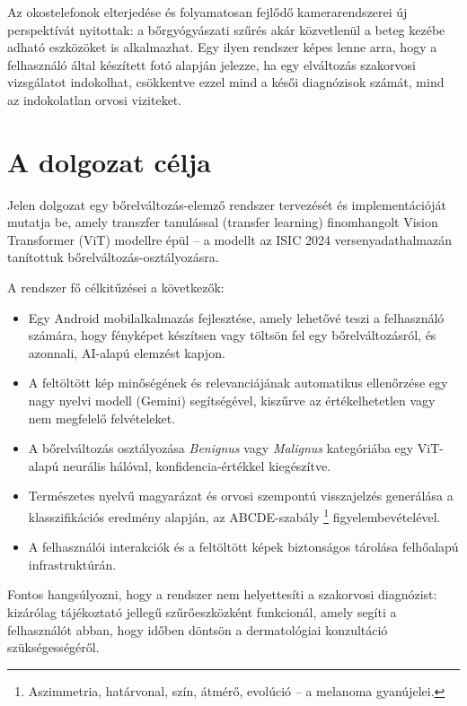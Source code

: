 Az okostelefonok elterjedése és folyamatosan fejlődő kamerarendszerei új
perspektívát nyitottak: a bőrgyógyászati szűrés akár közvetlenül a beteg kezébe
adható eszközöket is alkalmazhat. Egy ilyen rendszer képes lenne arra, hogy a
felhasználó által készített fotó alapján jelezze, ha egy elváltozás szakorvosi
vizsgálatot indokolhat, csökkentve ezzel mind a késői diagnózisok számát, mind az
indokolatlan orvosi viziteket.

\section{A dolgozat célja}

Jelen dolgozat egy bőrelváltozás-elemző rendszer tervezését és implementációját mutatja be, amely transzfer tanulással
(transfer learning) finomhangolt Vision Transformer (ViT)
\cite{dosovitskiy2021vit} modellre épül -- a modellt az ISIC 2024
versenyadathalmazán \cite{isic2024} tanítottuk bőrelváltozás-osztályozásra.

A rendszer fő célkitűzései a következők:

\begin{itemize}
    \item Egy Android mobilalkalmazás fejlesztése, amely lehetővé teszi a
    felhasználó számára, hogy fényképet készítsen vagy töltsön fel egy
    bőrelváltozásról, és azonnali, AI-alapú elemzést kapjon.
    \item A feltöltött kép minőségének és relevanciájának automatikus
    ellenőrzése egy nagy nyelvi modell (Gemini) segítségével, kiszűrve az
    értékelhetetlen vagy nem megfelelő felvételeket.
    \item A bőrelváltozás osztályozása \textit{Benignus} vagy \textit{Malignus}
    kategóriába egy ViT-alapú neurális hálóval,
    konfidencia-értékkel kiegészítve.
    \item Természetes nyelvű magyarázat és orvosi szempontú visszajelzés
    generálása a klasszifikációs eredmény alapján, az ABCDE-szabály
    \footnote{Aszimmetria, határvonal, szín, átmérő, evolúció -- a melanoma
    gyanújelei.} figyelembevételével.
    \item A felhasználói interakciók és a feltöltött képek biztonságos tárolása
    felhőalapú infrastruktúrán.
\end{itemize}

Fontos hangsúlyozni, hogy a rendszer nem helyettesíti a szakorvosi diagnózist:
kizárólag tájékoztató jellegű szűrőeszközként funkcionál, amely segíti a
felhasználót abban, hogy időben döntsön a dermatológiai konzultáció
szükségességéről.

